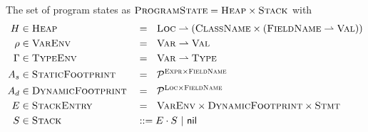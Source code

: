 The set of program states as $\textup{\textsc{ProgramState}} = \textup{\textsc{Heap}} \times \textup{\textsc{Stack}}$ with
\begin{align*}
	H      & \in \textup{\textsc{Heap}}       &  & =~~ \textup{\textsc{Loc}} \rightharpoonup (\textup{\textsc{ClassName}} \times (\textup{\textsc{FieldName}} \rightharpoonup \textup{\textsc{Val}})) \\
	\rho   & \in \textup{\textsc{VarEnv}}     &  & =~~ \textup{\textsc{Var}} \rightharpoonup \textup{\textsc{Val}}                                                        \\
	\Gamma & \in \textup{\textsc{TypeEnv}}    &  & =~~ \textup{\textsc{Var}} \rightharpoonup \textup{\textsc{Type}}                                                       \\
	A_s    & \in \textup{\textsc{StaticFootprint}} &  & =~~ \mathcal{P}^{\textup{\textsc{Expr}} \times \textup{\textsc{FieldName}}}                                                    \\
	A_d    & \in \textup{\textsc{DynamicFootprint}} &  & =~~ \mathcal{P}^{\textup{\textsc{Loc}} \times \textup{\textsc{FieldName}}}                                                     \\
	E      & \in \textup{\textsc{StackEntry}} &  & =~~ \textup{\textsc{VarEnv}} \times \textup{\textsc{DynamicFootprint}} \times \textup{\textsc{Stmt}}                                       \\
	S      & \in \textup{\textsc{Stack}}      &  & ::= E \cdot S ~|~ \textup{\textsf{nil}}
\end{align*}

\begin{comment}
REQUIRED?
\begin{definition}[Topmost Stack Entry]
    Let $\topmost : \setStack \rightharpoonup \setStackEntry$ be defined as
    \begin{align*}
    &\topmost(E \cdot S) = E\\
    &\topmost(\nil) \quad\textit{ undefined}
    \end{align*}
\end{definition}
\end{comment}


\begin{comment}
Program states with scheduled statement $s$ are defined as
\begin{displaymath}
\setProgramState_s ~\defeq~ \setHeap ~\times~ \{~~ (\rho, A_d, s) \cdot S ~~|~~ \rho \in \setVarEnv,~ A_d \in \setDFootprint,~ S \in \setStack ~~\}
\end{displaymath}
\end{comment}